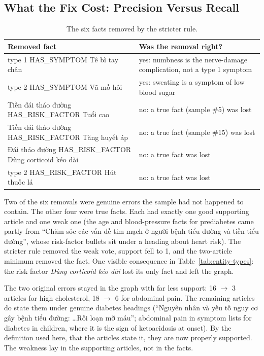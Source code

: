 \documentclass[11pt, a4paper]{article}
\begin{document}
\subsection{What the Fix Cost: Precision Versus Recall}
\label{sec:tradeoff}

\begin{table}[H]
\centering
\small
\caption{The six facts removed by the stricter rule.}
\label{tab:removed}
\begin{tabularx}{\textwidth}{X X}
\toprule
Removed fact & Was the removal right? \\
\midrule
type 1 HAS\_SYMPTOM Tê bì tay chân & yes: numbness is the nerve-damage complication, not a type 1 symptom \\
type 2 HAS\_SYMPTOM Vã mồ hôi & yes: sweating is a symptom of low blood sugar \\
Tiền đái tháo đường HAS\_RISK\_FACTOR Tuổi cao & no: a true fact (sample \#5) was lost \\
Tiền đái tháo đường HAS\_RISK\_FACTOR Tăng huyết áp & no: a true fact (sample \#15) was lost \\
Đái tháo đường HAS\_RISK\_FACTOR Dùng corticoid kéo dài & no: a true fact was lost \\
type 2 HAS\_RISK\_FACTOR Hút thuốc lá & no: a true fact was lost \\
\bottomrule
\end{tabularx}
\end{table}

Two of the six removals were genuine errors the sample had not happened to contain. The other four were true facts. Each had exactly one good supporting article and one weak one (the age and blood-pressure facts for prediabetes came partly from ``Chăm sóc các vấn đề tim mạch ở người bệnh tiểu đường và tiền tiểu đường'', whose risk-factor bullets sit under a heading about heart risk). The stricter rule removed the weak vote, support fell to 1, and the two-article minimum removed the fact. One visible consequence in Table~\ref{tab:entity-types}: the risk factor \emph{Dùng corticoid kéo dài} lost its only fact and left the graph.

The two original errors stayed in the graph with far less support: 16 $\rightarrow$ 3 articles for high cholesterol, 18 $\rightarrow$ 6 for abdominal pain. The remaining articles do state them under genuine diabetes headings (``Nguyên nhân và yếu tố nguy cơ gây bệnh tiểu đường: \ldots Rối loạn mỡ máu''; abdominal pain in symptom lists for diabetes in children, where it is the sign of ketoacidosis at onset). By the definition used here, that the articles state it, they are now properly supported. The weakness lay in the supporting articles, not in the facts.
\end{document}
